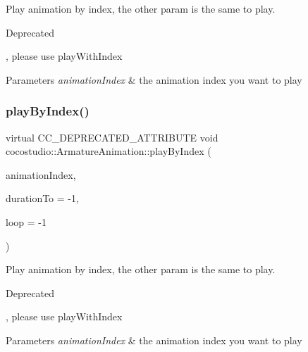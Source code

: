 Play animation by index, the other param is the same to play. \begin{DoxyRefDesc}{Deprecated}
\item[\hyperlink{deprecated__deprecated000076}{Deprecated}], please use play\+With\+Index \end{DoxyRefDesc}

\begin{DoxyParams}{Parameters}
{\em animation\+Index} & the animation index you want to play \\
\hline
\end{DoxyParams}
\mbox{\label{classcocostudio_1_1ArmatureAnimation_a4d35f44e90dfaf05b81c3bf69db59eae}} 
\subsubsection{\texorpdfstring{play\+By\+Index()}{playByIndex()}\hspace{0.1cm}{\footnotesize\ttfamily [2/2]}}
{\footnotesize\ttfamily virtual C\+C\+\_\+\+D\+E\+P\+R\+E\+C\+A\+T\+E\+D\+\_\+\+A\+T\+T\+R\+I\+B\+U\+TE void cocostudio\+::\+Armature\+Animation\+::play\+By\+Index (\begin{DoxyParamCaption}\item[{int}]{animation\+Index,  }\item[{int}]{duration\+To = {\ttfamily -\/1},  }\item[{int}]{loop = {\ttfamily -\/1} }\end{DoxyParamCaption})\hspace{0.3cm}{\ttfamily [virtual]}}

Play animation by index, the other param is the same to play. \begin{DoxyRefDesc}{Deprecated}
\item[\hyperlink{deprecated__deprecated000311}{Deprecated}], please use play\+With\+Index \end{DoxyRefDesc}

\begin{DoxyParams}{Parameters}
{\em animation\+Index} & the animation index you want to play \\
\hline
\end{DoxyParams}
\mbox{\label{classcocostudio_1_1ArmatureAnimation_ae57f2ee86afc4029b18aff18fda7d96d}} 
